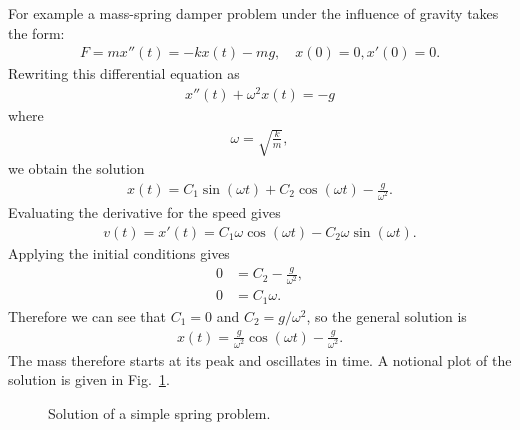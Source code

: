 For example a mass-spring damper problem under the influence of gravity takes the form:
\begin{align}
  F = m x''(t) = -k x(t) - mg, \quad x(0) = 0, x'(0) = 0.
\end{align}
Rewriting this differential equation as
\begin{align}
  x''(t) + \omega^2 x(t) = -g
\end{align}
where
\begin{align}
  \omega = \sqrt{ \frac{k}{m} },
\end{align}
we obtain the solution
\begin{align}
  x(t) = C_1 \sin( \omega t ) + C_2 \cos( \omega t ) - \frac{g}{\omega^2}.
\end{align}
Evaluating the derivative for the speed gives
\begin{align}
  v(t) = x'(t) = C_1 \omega \cos( \omega t )  - C_2 \omega \sin( \omega t ).
\end{align}
Applying the initial conditions gives
\begin{subequations}
\begin{align}
  0 &= C_2 - \frac{g}{\omega^2}, \\
  0 &= C_1 \omega. 
\end{align}
\end{subequations}
Therefore we can see that $C_1 = 0$ and $C_2 = g/\omega^2$, so the general solution is
\begin{align}
  x(t) = \frac{g}{\omega^2} \cos( \omega t ) - \frac{g}{\omega^2}.
\end{align}
The mass therefore starts at its peak and oscillates in time. A notional plot of the solution is given in Fig.~\ref{Fig:ode_SimpleSpringProblem}.

\begin{figure}[htp!]
\begin{center}
\caption{Solution of a simple spring problem.}
\label{Fig:ode_SimpleSpringProblem}
\end{center}
\end{figure}

